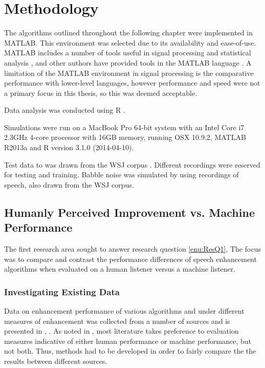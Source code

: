 
\chapter{Methodology}

\acresetall

The algorithms outlined throughout the following chapter were implemented
in MATLAB. This environment was selected due to its availability and
ease-of-use. MATLAB includes a number of tools useful in signal processing
and statistical analysis \citep{Krauss1994,Jones1997}, and other
authors have provided tools in the MATLAB language \citep{Hoyer2004,Brookes1997,Loizou2008,Wojcicki2011}.
A limitation of the MATLAB environment in signal processing is the
comparative performance with lower-level languages, however performance
and speed were not a primary focus in this thesis, so this was deemed
acceptable.

Data analysis was conducted using R \citep{RCoreTeam2014}.

Simulations were run on a MacBook Pro 64-bit system with an Intel
Core i7 2.3GHz 4-core processor with 16GB memory, running OSX 10.9.2,
MATLAB R2013a and R version 3.1.0 (2014-04-10).

Test data to was drawn from the \ac{WSJ} corpus \citep{Robinson1995}.
Different recordings were reserved for testing and training. Babble
noise was simulated by using recordings of speech, also drawn from
the \ac{WSJ} corpus.


\section{Humanly Perceived Improvement vs. Machine Performance}

The first research area sought to answer research question \vref{enu:ResQ1},
\textit{\RQone{}} The focus was to compare and contrast the performance
differences of speech enhancement algorithms when evaluated on a human
listener versus a machine listener.


\subsection{\label{sub:Method-Existing-Data}Investigating Existing Data}

Data on enhancement performance of various algorithms and under different
measures of enhancement was collected from a number of sources \citep{mohammadiha2013supervised,Wilson2008,Schmidt2006,Raj2005,Rennie2008,Weninger2011,Williamson2014,Paliwal2010,Plourde2007}
and is presented in , . As
noted in  \textit{},
most literature takes preference to evaluation measures indicative
of either human performance or machine performance, but not both.
Thus, methods had to be developed in order to fairly compare the the
results between different sources.

